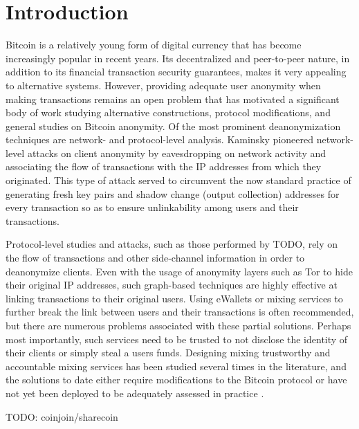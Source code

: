 \section{Introduction}
Bitcoin is a relatively young form of digital currency that has become increasingly popular in recent years. Its decentralized and peer-to-peer nature, in addition to its financial transaction security guarantees, makes it very appealing to alternative systems. However, providing adequate user anonymity when making transactions remains an open problem that has motivated a significant body of work studying alternative constructions, protocol modifications, and general studies on Bitcoin anonymity. Of the most prominent deanonymization techniques are network- and protocol-level analysis. Kaminsky \cite{kaminsky} pioneered network-level attacks on client anonymity by eavesdropping on network activity and associating the flow of transactions with the IP addresses from which they originated. This type of attack served to circumvent the now standard practice of generating fresh key pairs and shadow change (output collection) addresses for every transaction so as to ensure unlinkability among users and their transactions. 

Protocol-level studies and attacks, such as those performed by TODO, rely on the flow of transactions and other side-channel information in order to deanonymize clients. Even with the usage of anonymity layers such as Tor to hide their original IP addresses, such graph-based techniques are highly effective at linking transactions to their original users. Using eWallets or mixing services to further break the link between users and their transactions is often recommended, but there are numerous problems associated with these partial solutions. Perhaps most importantly, such services need to be trusted to not disclose the identity of their clients or simply steal a users funds. Designing mixing trustworthy and accountable mixing services has been studied several times in the literature, and the solutions to date either require modifications to the Bitcoin protocol \cite{BitterToBetter} or have not yet been deployed to be adequately assessed in practice \cite{mixcoin}. 

TODO: coinjoin/sharecoin

